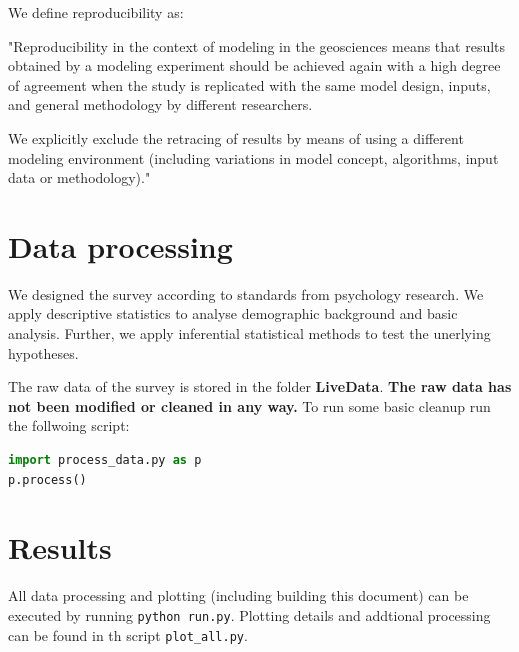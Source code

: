 \documentclass{article}
\begin{document}
We define reproducibility as:

"Reproducibility in the context of modeling in the geosciences means that results obtained by a modeling experiment should be achieved again with a high degree of agreement when the study is replicated with the same model design, inputs, and general methodology by different researchers.

We explicitly exclude the retracing of results by means of using a different modeling environment (including variations in model concept, algorithms, input data or methodology)."

\section{Data processing}
We designed the survey according to standards from psychology research. We apply descriptive statistics to analyse demographic background and basic analysis.
Further, we apply inferential statistical methods to test the unerlying hypotheses.

The raw data of the survey is stored in the folder \textbf{LiveData}. \textbf{The raw data has not been modified or cleaned in any way.}
To run some basic cleanup run the follwoing script: 

\begin{lstlisting}[language=Python]
import process_data.py as p
p.process()
\end{lstlisting}

\section{Results}
All data processing and plotting (including building this document) can be executed by running \lstinline{python run.py}.
Plotting details and addtional processing can be found in th script \lstinline{plot_all.py}.
\end{document}
